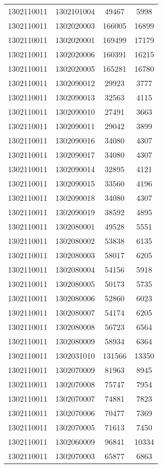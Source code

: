 \begin{longtable}[h]{llcc}
		1302110011 & 1302101004 & 49467 & 5998\\
		1302110011 & 1302020003 & 166005 & 16899\\
		1302110011 & 1302020001 & 169499 & 17179\\
		1302110011 & 1302020006 & 160391 & 16215\\
		1302110011 & 1302020005 & 165281 & 16780\\
		1302110011 & 1302090012 & 29923 & 3777\\
		1302110011 & 1302090013 & 32563 & 4115\\
		1302110011 & 1302090010 & 27491 & 3663\\
		1302110011 & 1302090011 & 29042 & 3899\\
		1302110011 & 1302090016 & 34080 & 4307\\
		1302110011 & 1302090017 & 34080 & 4307\\
		1302110011 & 1302090014 & 32895 & 4121\\
		1302110011 & 1302090015 & 33560 & 4196\\
		1302110011 & 1302090018 & 34080 & 4307\\
		1302110011 & 1302090019 & 38592 & 4895\\
		1302110011 & 1302080001 & 49528 & 5551\\
		1302110011 & 1302080002 & 53838 & 6135\\
		1302110011 & 1302080003 & 58017 & 6205\\
		1302110011 & 1302080004 & 54156 & 5918\\
		1302110011 & 1302080005 & 50173 & 5735\\
		1302110011 & 1302080006 & 52860 & 6023\\
		1302110011 & 1302080007 & 54174 & 6205\\
		1302110011 & 1302080008 & 56723 & 6564\\
		1302110011 & 1302080009 & 58934 & 6364\\
		1302110011 & 1302031010 & 131566 & 13350\\
		1302110011 & 1302070009 & 81963 & 8945\\
		1302110011 & 1302070008 & 75747 & 7954\\
		1302110011 & 1302070007 & 74881 & 7823\\
		1302110011 & 1302070006 & 70477 & 7369\\
		1302110011 & 1302070005 & 71613 & 7450\\
		1302110011 & 1302060009 & 96841 & 10334\\
		1302110011 & 1302070003 & 65877 & 6863\\

\end{longtable}

